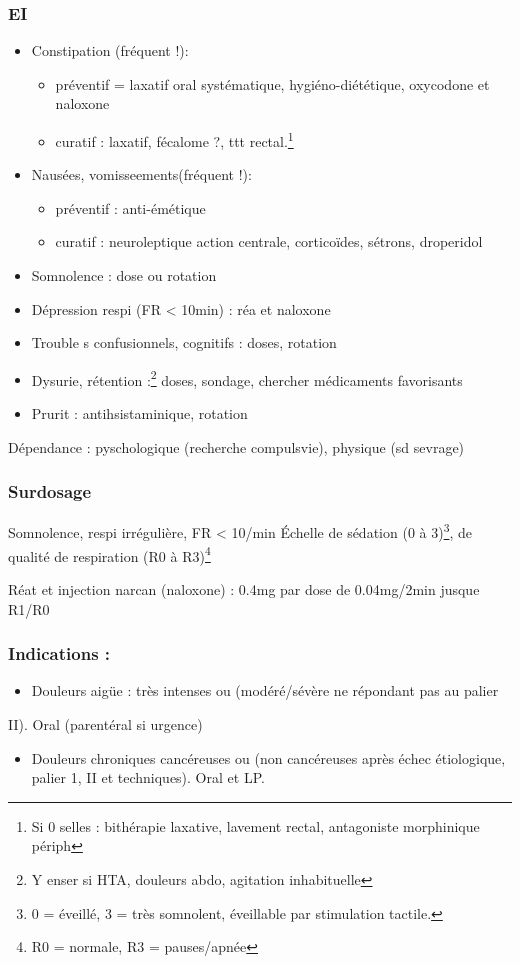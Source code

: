 \documentclass[11pt]{article}
\begin{document}
\subsubsection{EI}
\label{sec:org8e68cd8}
\begin{itemize}
\item Constipation (fréquent !):
\begin{itemize}
\item préventif = laxatif oral systématique, hygiéno-diététique, oxycodone et
naloxone
\item curatif : \inc laxatif, fécalome ?, ttt rectal.\footnote{Si 0 selles : bithérapie laxative, lavement rectal, antagoniste
morphinique périph}
\end{itemize}
\item Nausées, vomisseements(fréquent !):
\begin{itemize}
\item préventif : anti-émétique
\item curatif : neuroleptique action centrale, corticoïdes, sétrons, droperidol
\end{itemize}
\item Somnolence : \dec dose ou rotation
\item Dépression respi (FR < 10min) : réa et naloxone
\item Trouble s confusionnels, cognitifs : \dec doses, rotation
\item Dysurie, rétention :\footnote{Y enser si HTA, douleurs abdo, agitation inhabituelle} \dec doses, sondage, chercher médicaments favorisants
\item Prurit : antihsistaminique, rotation
\end{itemize}

Dépendance : pyschologique (recherche compulsvie), physique (sd sevrage)

\subsubsection{Surdosage}
\label{sec:org284d455}
Somnolence, respi irrégulière, FR < 10/min
Échelle de sédation (0 à 3)\footnote{0 = éveillé, 3 = très somnolent, éveillable par stimulation tactile.}, de qualité de respiration (R0 à R3)\footnote{R0 = normale, R3 = pauses/apnée}

Réat et injection narcan (naloxone) : 0.4mg par dose de 0.04mg/2min jusque R1/R0

\subsubsection{Indications :}
\label{sec:orge48b373}
\begin{itemize}
\item Douleurs aigüe : très intenses ou (modéré/sévère ne répondant pas au palier
\end{itemize}
II). Oral (parentéral si urgence)
\begin{itemize}
\item Douleurs chroniques cancéreuses ou (non cancéreuses après échec étiologique,
palier 1, II et techniques). Oral et LP.
\end{itemize}
\end{document}
